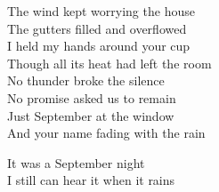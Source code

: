 \begin{lyrics}
The wind kept worrying the house\\
The gutters filled and overflowed\\
I held my hands around your cup\\
Though all its heat had left the room\\
No thunder broke the silence\\
No promise asked us to remain\\
Just September at the window\\
And your name fading with the rain

It was a September night\\
I still can hear it when it rains
\end{lyrics}
